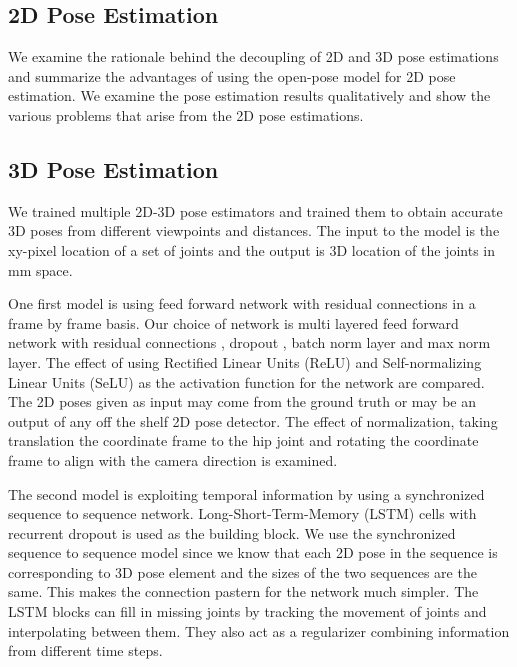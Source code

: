 \subsection{2D Pose Estimation}

We examine the rationale behind the decoupling of 2D and 3D pose estimations and summarize the advantages of using the open-pose \parencite{cao2016realtime} model for 2D pose estimation. We examine the pose estimation results qualitatively and show the various problems that arise from the 2D pose estimations.

\subsection{3D Pose Estimation}

We trained multiple 2D-3D pose estimators and trained them to obtain accurate 3D poses from different viewpoints and distances. The input to the model is the xy-pixel location of a set of joints and the output is 3D location of the joints in mm space.

One first model is using feed forward network with residual connections in a frame by frame basis. Our choice of network is multi layered feed forward network with residual connections \parencite{he2016deep}, dropout \parencite{srivastava2014dropout}, batch norm layer \parencite{ioffe2015batch} and max norm layer. The effect of using Rectified Linear Units (ReLU) \parencite{nair2010rectified} and Self-normalizing Linear Units (SeLU) \parencite{klambauer2017self} as the activation function for the network are compared. The 2D poses given as input may come from the ground truth or may be an output of any off the shelf 2D pose detector. The effect of normalization, taking translation the coordinate frame to the hip joint and rotating the coordinate frame to align with the camera direction is examined. 

The second model is exploiting temporal information by using a synchronized sequence to sequence network. Long-Short-Term-Memory (LSTM) \parencite{hochreiter1997long} cells with recurrent dropout \parencite{semeniuta2016recurrent} is used as the building block. We use the synchronized sequence to sequence model since we know that each 2D pose in the sequence is corresponding to 3D pose element and the sizes of the two sequences are the same. This makes the connection pastern for the network much simpler. The LSTM blocks can fill in missing joints by tracking the movement of joints and interpolating between them. They also act as a regularizer combining information from different time steps.  

